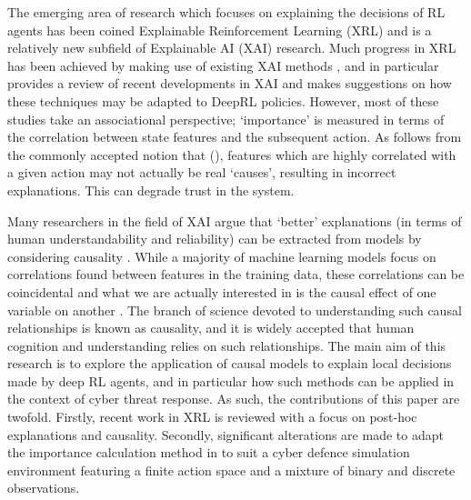 \documentclass{article}
\begin{document}
The emerging area of research which focuses on explaining the decisions of RL agents has been coined Explainable Reinforcement Learning (XRL) and is a relatively new subfield of Explainable AI (XAI) research. Much progress in XRL has been achieved by making use of existing XAI methods \cite{wang2022causal}, and in particular \cite{heuillet2021explainability} provides a review of recent developments in XAI and makes suggestions on how these techniques may be adapted to DeepRL policies. However, most of these studies take an associational perspective; `importance' is measured in terms of the correlation between state features and the subsequent action. As follows from the commonly accepted notion that  (\cite{PearlMackenzie18}), features which are highly correlated with a given action may not actually be real `causes', resulting in incorrect explanations. This can degrade trust in the system.


Many researchers in the field of XAI argue that `better' explanations (in terms of human understandability and reliability) can be extracted from models by considering causality \cite{madumal2020explainable}. While a majority of machine learning models focus on correlations found between features in the training data, these correlations can be coincidental and what we are actually interested in is the causal effect of one variable on another \cite{PearlMackenzie18}. The branch of science devoted to understanding such causal relationships is known as causality, and it is widely accepted that human cognition and understanding relies on such relationships. The main aim of this research is to explore the application of causal models to explain local decisions made by deep RL agents, and in particular how such methods can be applied in the context of cyber threat response. As such, the contributions of this paper are twofold.  Firstly, recent work in XRL is reviewed with a focus on post-hoc explanations and causality. Secondly, significant alterations are made to adapt the importance calculation method in \cite{wang2022causal} to suit a cyber defence simulation environment featuring a finite action space and a mixture of binary and discrete observations.

\end{document}

